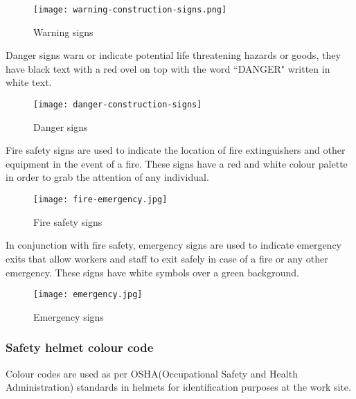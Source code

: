 \documentclass[a4paper,12pt]{article}
\begin{document}
			\begin{figure}[H]
				\begin{center}				
					\texttt{[image: warning-construction-signs.png]}
				\end{center}
				\caption{Warning signs}
				\label{fig:Warning signs}
			\end{figure} 
				
			Danger signs warn or indicate potential life threatening hazards or goods, they have black text with a red ovel on top with the word ``DANGER" written in white text.
			\begin{figure}[H]
				\begin{center}				
					\texttt{[image: danger-construction-signs]}
				\end{center}
				\caption{Danger signs}
				\label{fig:Danger signs}
			\end{figure} 
				
			\newpage
			Fire safety signs are used to indicate the location of fire extinguishers and other equipment in the event of a fire.
			These signs have a red and white colour palette in order to grab the attention of any individual.
				
			\begin{figure}[H]
				\begin{center}				
					\texttt{[image: fire-emergency.jpg]}
				\end{center}
				\caption{Fire safety signs}
				\label{fig:Fire safety signs}
			\end{figure}  
				
			In conjunction with fire safety, emergency signs are used to indicate emergency exits that allow workers and staff to exit safely in case of a fire or any other emergency.
			These signs have white symbols over a green background.  	
			\begin{figure}[H]
				\begin{center}				
					\texttt{[image: emergency.jpg]}
				\end{center}
				\caption{Emergency signs}
				\label{fig:Emergency signs}
			\end{figure}
			
			\newpage
			\subsubsection{Safety helmet colour code}
				
				Colour codes are used as per OSHA(Occupational Safety and Health Administration) standards in helmets for identification purposes at the work site.
				
\end{document}
